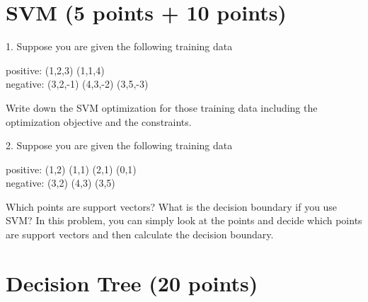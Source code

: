 \documentclass{article}
\begin{document}

\section{SVM (5 points + 10 points)}

1. Suppose you are given the following training data 

positive: (1,2,3) (1,1,4) \\
negative: (3,2,-1) (4,3,-2) (3,5,-3)

Write down the SVM optimization for those training data including the optimization objective and the constraints. 

2. Suppose you are given the following training data 

positive: (1,2) (1,1) (2,1) (0,1)\\
negative: (3,2) (4,3) (3,5)

Which points are support vectors? What is the decision boundary if you use SVM? In this problem, you can simply look at the points and decide which points are support vectors and then calculate the decision boundary. 

\section{Decision Tree (20 points)}

\begin{comment}
The following table contains training examples that help predict whether a person is likely to have come kind of disease.

\begin{center}
\begin{tabular}{ l l l l l l } 
ID &	PAIN? &	MALE? &	SMOKES? &	WORK OUT? &	DISEASE?\\
1. &	yes &	yes &	no &	yes &	yes\\
2. &	yes &	yes &	yes &	no &	yes\\
3. &	no &	no &	yes &	no &	yes\\
4. &	no &	yes &	no &	yes &	no\\
5. &	yes &	no &	yes &	yes &	yes\\
6. &	no &	yes &	yes &	yes &	no
\end{tabular}
\end{center}

Use information gain (entropy) to construct a minimal decision tree that predicts whether or not someone is likely to have this disease. Show your computation in each step. Write down your decision tree as a number of decision rules.
\end{comment}
\end{document}
